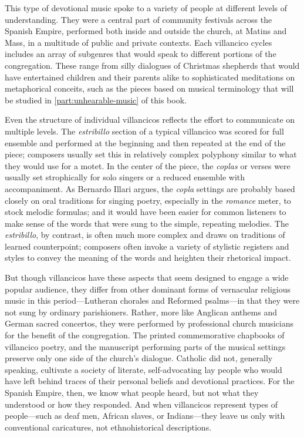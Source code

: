 This type of devotional music spoke to a variety of people at different levels
of understanding.
They were a central part of community festivals across the Spanish Empire,
performed both inside and outside the church, at Matins and Mass, in a multitude
of public and private contexts.
Each villancico cycles includes an array of subgenres that would speak to
different portions of the congregation.
These range from silly dialogues of Christmas shepherds that would have
entertained children and their parents alike to sophisticated meditations on
metaphorical conceits, such as the pieces based on musical terminology that will
be studied in \cref{part:unhearable-music} of this book.

Even the structure of individual villancicos reflects the effort to communicate
on multiple levels.
The \emph{estribillo} section of a typical villancico was scored for full
ensemble and performed at the beginning and then repeated at the end of the
piece; composers usually set this in relatively complex polyphony similar to
what they would use for a motet.
In the center of the piece, the \emph{coplas} or verses were usually set
strophically for solo singers or a reduced ensemble with accompaniment.
As Bernardo Illari argues, the \emph{copla} settings are probably based closely
on oral traditions for singing poetry, especially in the \emph{romance} meter,
to stock melodic formulas; and it would have been easier for common listeners to
make sense of the words that were sung to the simple, repeating melodies.%
    \Autocite{Illari:Polychoral}
The \emph{estribillo}, by contrast, is often much more complex and draws on
traditions of learned counterpoint; composers often invoke a variety of
stylistic registers and styles to convey the meaning of the words and heighten
their rhetorical impact.

But though villancicos have these aspects that seem designed to engage a wide
popular audience, they differ from other dominant forms of vernacular religious
music in this period---Lutheran chorales and Reformed psalms---in that they were
not sung by ordinary parishioners.
Rather, more like Anglican anthems and German sacred concertos, they were
performed by professional church musicians for the benefit of the congregation.
The printed commemorative chapbooks of villancico poetry, and the manuscript
performing parts of the musical settings preserve only one side of the church's
dialogue.
Catholic did not, generally speaking, cultivate a society of literate,
self-advocating lay people who would have left behind traces of their personal
beliefs and devotional practices.
For the Spanish Empire, then, we know what people heard, but not what they
understood or how they responded.%
    \Autocite{Burstyn:PeriodEar} %
And when villancicos represent types of people---such as deaf men, African
slaves, or Indians---they leave us only with conventional caricatures, not
ethnohistorical descriptions.%
    \Autocites
    {Baker:EthnicVC}
    {Baker:PerformancePostColonial}
    {Davies:LocalContent}


